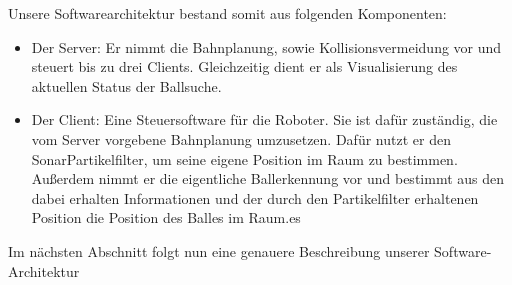 Unsere Softwarearchitektur bestand somit aus folgenden Komponenten:
\begin{itemize}
\item Der Server: Er nimmt die Bahnplanung, sowie Kollisionsvermeidung
  vor und steuert bis zu drei Clients. Gleichzeitig dient er als
  Visualisierung des aktuellen Status der Ballsuche.
\item Der Client: Eine Steuersoftware für die Roboter. Sie ist dafür
  zuständig, die vom Server vorgebene Bahnplanung umzusetzen. Dafür
  nutzt er den SonarPartikelfilter, um seine eigene Position im Raum
  zu bestimmen. Außerdem nimmt er die eigentliche Ballerkennung vor
  und bestimmt aus den dabei erhalten Informationen und der durch den
  Partikelfilter erhaltenen Position die Position des Balles im Raum.es
\end{itemize}
Im nächsten Abschnitt folgt nun eine genauere Beschreibung unserer Software-Architektur
